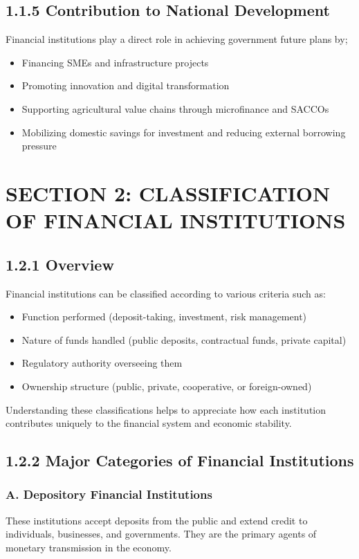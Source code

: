 \documentclass[10pt]{article}
\begin{document}
\subsection*{1.1.5 Contribution to National Development}
Financial institutions play a direct role in achieving government future plans by;

\begin{itemize}
  \item Financing SMEs and infrastructure projects
  \item Promoting innovation and digital transformation
  \item Supporting agricultural value chains through microfinance and SACCOs
  \item Mobilizing domestic savings for investment and reducing external borrowing pressure
\end{itemize}

\section*{SECTION 2: CLASSIFICATION OF FINANCIAL INSTITUTIONS}
\subsection*{1.2.1 Overview}
Financial institutions can be classified according to various criteria such as:

\begin{itemize}
  \item Function performed (deposit-taking, investment, risk management)
  \item Nature of funds handled (public deposits, contractual funds, private capital)
  \item Regulatory authority overseeing them
  \item Ownership structure (public, private, cooperative, or foreign-owned)
\end{itemize}

Understanding these classifications helps to appreciate how each institution contributes uniquely to the financial system and economic stability.

\subsection*{1.2.2 Major Categories of Financial Institutions}
\subsubsection*{A. Depository Financial Institutions}
These institutions accept deposits from the public and extend credit to individuals, businesses, and governments. They are the primary agents of monetary transmission in the economy.
\end{document}
